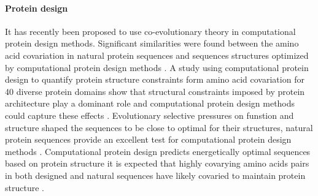 \paragraph{Protein design}
It has recently been proposed to use co-evolutionary theory in computational protein design methods.
Significant similarities were found between the amino acid covariation in natural protein sequences and sequences structures optimized by computational protein design methods \cite{ollikainen2013computational}.
A study \cite{ollikainen2013computational} using computational protein design to quantify protein structure constraints form amino acid covariation for 40 diverse protein domains show that structural constraints imposed by protein architecture play a dominant role and computational protein design methods could capture these effects \cite{ollikainen2013computational}.
Evolutionary selective pressures on funstion and structure shaped the sequences to be close to optimal for their structures, natural protein sequences provide an excellent test for computational protein design methods \cite{ollikainen2013computational}.
Computational protein design predicts energetically optimal sequences based on protein structure it is expected that highly covarying amino acids pairs in both designed and natural sequences have likely covaried to maintain protein structure \cite{ollikainen2013computational}.

